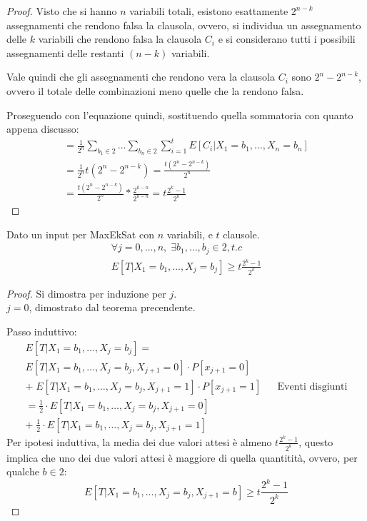 \begin{proof}
    Visto che si hanno $n$ variabili totali, esistono esattamente $2^{n-k}$ assegnamenti che rendono falsa la clausola, ovvero, 
    si individua un assegnamento delle $k$ variabili che rendono falsa la clausola $C_i$ e si considerano tutti i possibili assegnamenti 
    delle restanti $(n-k)$ variabili.
    
    Vale quindi che gli assegnamenti che rendono vera la clausola $C_i$ sono $2^n - 2^{n-k}$, ovvero il totale delle combinazioni 
    meno quelle che la rendono falsa.

    Proseguendo con l'equazione quindi, sostituendo quella sommatoria con quanto appena discusso:
    \begin{equation}
        \begin{aligned}
            = \frac{1}{2^n}\sum_{b_1 \in 2 } \dots \sum_{b_n \in 2 } \sum_{i=1}^{t} E[C_i | X_1 = b_1, \dots, X_n = b_n] \\
            = \frac{1}{2^n}t(2^n - 2^{n-k}) = \frac{t(2^n - 2^{n-k})}{2^n}\\
            =  \frac{t(2^n - 2^{n-k})}{2^n} * \frac{2^{k-n}}{2^{k-n}} = t\frac{2^k -1}{2^k}
        \end{aligned}
    \end{equation}
\end{proof}
\begin{theorem}
    \label{maxth}
    Dato un input per MaxEkSat con $n$ variabili, e $t$ clausole.
    \begin{equation}
        \begin{aligned}
            \forall j = 0, \dots, n,\;\exists b_1, \dots, b_j \in 2, t.c\\
            E[T|X_1 = b_1, \dots, X_j = b_j] \geq  t\frac{2^k -1}{2^k}
        \end{aligned}
    \end{equation}
\end{theorem}
\begin{proof}
    Si dimostra per induzione per $j$.\\
    $j = 0$, dimostrato dal teorema precendente.
    
    Passo induttivo:
    \begin{equation}
        \begin{aligned}
            E[T|X_1 = b_1, \dots, X_j = b_j] = \\
            E[T|X_1 = b_1, \dots, X_j = b_j, X_{j+1} = 0]\cdot P[x_{j+1} = 0]\\
            +\;E[T|X_1 = b_1, \dots, X_j = b_j, X_{j+1} = 1]\cdot P[x_{j+1} = 1] &&\text{Eventi disgiunti}\\
            = \frac{1}{2}\cdot E[T|X_1 = b_1, \dots, X_j = b_j, X_{j+1} = 0]\\
            + \; \frac{1}{2}\cdot E[T|X_1 = b_1, \dots, X_j = b_j, X_{j+1} = 1]
        \end{aligned}
    \end{equation}
    Per ipotesi induttiva, la media dei due valori attesi è almeno $t\frac{2^k -1}{2^k}$, 
    questo implica che uno dei due valori attesi è maggiore di quella quantitità, ovvero, 
    per qualche $b \in 2$:
    $$E[T|X_1 = b_1, \dots, X_j = b_j, X_{j+1} = b] \geq t\frac{2^k -1}{2^k}$$
\end{proof}
